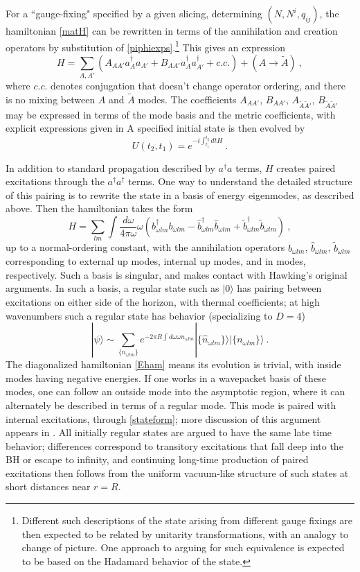 \documentclass[12pt]{article}
\numberwithin{equation}{section}
\newcommand{\beq}{\begin{equation}}
\newcommand{\eeq}{\end{equation}}
\newcommand{\tA}{{\tilde A}}
\begin{document}
For a ``gauge-fixing" specified by a  given slicing, determining $(N, N^i, q_{ij})$, the hamiltonian \eqref{matH} can be rewritten in terms of the annihilation and creation operators by substitution of \eqref{piphiexps}.\footnote{Different such descriptions of the state arising from different gauge fixings are then expected to be related by unitarity transformations, with an analogy to change of picture.  One approach to arguing for such equivalence is expected to be based on the Hadamard behavior of the state\cite{KaWa}.} This gives an expression
\beq\label{Hama}
H = \sum_{A,A'} \left(A_{AA'} a^\dagger_A a_{A'} + B_{AA'} a^\dagger_A a^\dagger_{A'} + c.c. \right) + (A\rightarrow \tilde A)\ ,
\eeq
where $c.c.$ denotes conjugation that doesn't change operator ordering, and there is no mixing between $A$ and $\tilde A$ modes.  The coefficients $A_{AA'}$, $B_{AA'}$, $A_{\tA\tA'}$, $B_{\tA\tA'}$ may be expressed in terms of the mode basis and the metric coefficients, with explicit expressions given in \cite{SEHS,SE2d,GiPe1}
A specified initial state is then evolved by
\beq\label{Uev}
U(t_2,t_1)= e^{-i\int_{t_1}^{t_2} dt H}\ .
\eeq

In addition to standard propagation described by $a^\dagger a$ terms, $H$ creates paired excitations through the $a^\dagger a^\dagger$ terms.  One way to understand the detailed structure of this pairing is to rewrite the state in a basis of energy eigenmodes, as described above.  
Then the hamiltonian takes the form\cite{GiPe1}
\beq\label{Eham}
H= \sum_{lm} \int \frac{d\omega}{4 \pi \omega} \omega (b_{\omega lm}^{\dagger}b_{\omega lm} - \hat b_{\omega lm}^{\dagger} \hat b_{\omega lm} + \tilde b_{\omega lm}^{\dagger}\tilde b_{\omega lm}  )  \ ,
\eeq 
up to a normal-ordering constant, with the annihilation operators $b_{\omega lm}$, $\hat b_{\omega lm}$, $\tilde b_{\omega lm}$ corresponding to external up modes, internal up modes, and in modes, respectively.
Such a basis is singular, and makes contact with Hawking's original arguments\cite{Hawk}.  In such a basis, a regular state such as $|0\rangle$ has pairing between excitations on either side of the horizon, with thermal coefficients; at high wavenumbers such a regular state has behavior (specializing to $D=4$)
\beq\label{stateform}
|\psi\rangle \sim\sum_{\{n_{\omega lm}\}} e^{-2\pi R\int d\omega \omega n_{\omega lm} }| \{\hat n_{\omega lm}\} \rangle |\{n_{\omega lm}\}\rangle\ .
\eeq
The diagonalized hamiltonian \eqref{Eham} means its evolution is trivial, with inside modes having negative energies.  If one works in a wavepacket basis of these modes, one can follow an outside mode into the asymptotic region, where it can alternately be described in terms of a regular mode.  This mode is paired with internal excitations, through \eqref{stateform}; more discussion of this argument appears in \cite{GiPe1}.  All initially regular states are argued to have the same late time behavior; differences correspond to transitory excitations that fall deep into the BH or escape to infinity, and continuing long-time production of paired excitations then follows from the uniform vacuum-like structure of such states at short distances near $r=R$.
\end{document}
